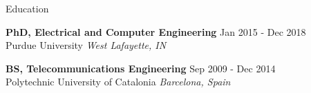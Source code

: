 \documentclass{resume} %
\begin{document}

\begin{rSection}{Education}

{\bf PhD, Electrical and Computer Engineering} \hfill {Jan 2015 - Dec 2018} \\
Purdue University \hfill {\em West Lafayette, IN\\}


{\bf BS, Telecommunications Engineering} \hfill {Sep 2009 - Dec 2014} \\ 
Polytechnic University of Catalonia \hfill {\em Barcelona, Spain}

\vspace{-1pt}

\end{rSection}

\end{document}
